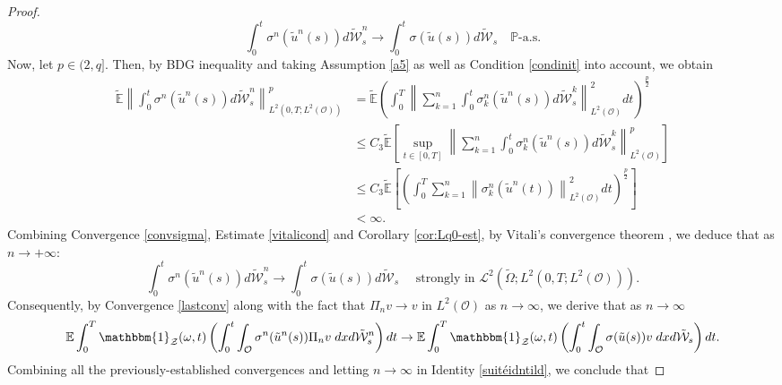 \documentclass[10pt,number,preprint,times]{elsarticle}
\numberwithin{equation}{section} %
\begin{document}
\begin{proof}
\begin{equation}\label{partie1}
\int_0^t \sigma^n(\tilde{u}^n(s)) d\tilde{\mathcal{W}}^n_s \rightarrow  \int_0^t \sigma(\tilde{u}(s)) d\tilde{\mathcal{W}}_s\quad \mathbb{P}\text{-a.s}.
\end{equation}
Now, let $p \in (2,q]$. Then, by BDG inequality and taking Assumption \ref{a5} as well as Condition \eqref{condinit} into account, we obtain
\begin{align}\label{vitalicond}
	\tilde{\mathbb{E}}{\left\|\int_0^t \sigma^n\left(\tilde{u}^n(s)\right) d \tilde{\mathcal{W}}^{n}_s\right\|_{L^2\left(0,T; L^2(\mathcal{O})\right)}^p}& =\tilde{\mathbb{E}}\left(\int_0^T\left\|\sum_{k=1}^n \int_0^t \sigma_{k}^n\left(\tilde{u}^n(s)\right) d \tilde{\mathcal{W}}_{s}^k\right\|_{L^2(\mathcal{O})}^2 d t\right)^{\frac{p}{2}}\nonumber \\
	& \leq {C}_3 \tilde{\mathbb{E}}\left[\sup _{t \in[0, T]}\left\|\sum_{k=1}^n \int_0^t \sigma_{ k}^n\left(\tilde{u}^n(s)\right) d \tilde{\mathcal{W}}_{s}^k\right\|_{L^2(\mathcal{O})}^p\right]  \nonumber \\ 
	& \leq C_3 \tilde{\mathbb{E}}\left[\left(\int_0^T \sum_{k=1}^n\left\|\sigma_{k}^n\left(\tilde{u}^n(t)\right)\right\|_{L^2(\mathcal{O})}^2 d t\right)^{\frac{p}{2}}\right]\nonumber \\
	&<\infty. 
\end{align}
Combining  Convergence \eqref{convsigma}, Estimate \eqref{vitalicond} and Corollary \ref{cor:Lq0-est}, by Vitali's convergence theorem \cite[Theorem 24]{dhariwal2019global}, we deduce that as $n \rightarrow +\infty$: 
\begin{equation}\label{lastconv}
\int_0^t \sigma^n(\tilde{u}^n(s)) d\tilde{\mathcal{W}}^n_s \rightarrow  \int_0^t \sigma(\tilde{u}(s)) d\tilde{\mathcal{W}}_s\quad \text{ strongly in } \mathcal{L}^2(\tilde{\Omega};L^2(0,T;L^2(\mathcal{O}))).
\end{equation}
Consequently, by Convergence \eqref{lastconv} along with the fact that $\Pi_n v \rightarrow v$  in $L^2(\mathcal{O})$ as $n \rightarrow \infty$, we derive that as $n \rightarrow \infty$
$$
\mathbb{E} \int_{0}^T  \mathbbm{1}_{\mathcal{Z}}(\omega,t)  \left(\int_{0}^t  \int_{\mathcal{O}} \sigma^n(\tilde{u}^n(s)) \Pi_nv\; dx d\tilde{\mathcal{W}}^n_s\right)dt \rightarrow \mathbb{E}  \int_{0}^T  \mathbbm{1}_{\mathcal{Z}}(\omega,t) \left(\int_{0}^t \int_{\mathcal{O}} \sigma(\tilde{u}(s)) v\; dx d\tilde{\mathcal{W}}_s\right)dt.
$$
Combining all the previously-established convergences and letting $n \rightarrow \infty$ in Identity \eqref{suitéidntild}, we conclude that  

\end{proof}
\end{document}
